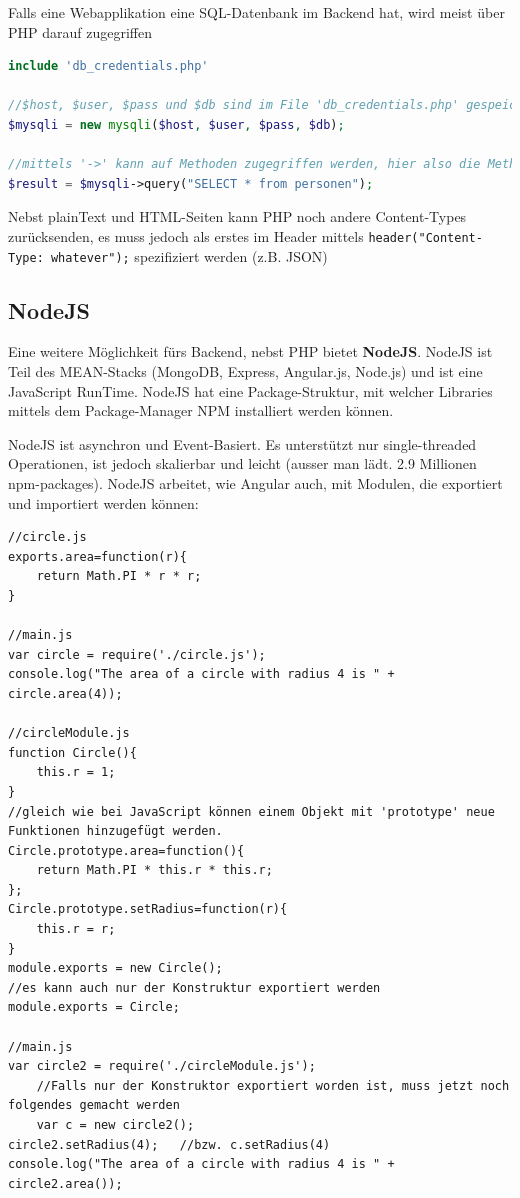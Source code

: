 \documentclass[a4paper, 11pt]{article}
\newcommand{\code}[1]{\texttt{#1}}
\begin{document}
\vspace{10px}

\noindent Falls eine Webapplikation eine SQL-Datenbank im Backend hat, wird meist über PHP darauf zugegriffen

\begin{lstlisting}[language=php]
include 'db_credentials.php'

//$host, $user, $pass und $db sind im File 'db_credentials.php' gespeichert
$mysqli = new mysqli($host, $user, $pass, $db);

//mittels '->' kann auf Methoden zugegriffen werden, hier also die Methode 'query' vom mysqli-Objekt
$result = $mysqli->query("SELECT * from personen");

\end{lstlisting}

Nebst plainText und HTML-Seiten kann PHP noch andere Content-Types zurücksenden, es muss jedoch als erstes im Header mittels \code{header("Content-Type: whatever");} spezifiziert werden (z.B. JSON)

\subsection{NodeJS}
Eine weitere Möglichkeit fürs Backend, nebst PHP bietet \textbf{NodeJS}. NodeJS ist Teil des MEAN-Stacks (MongoDB, Express, Angular.js, Node.js) und ist eine JavaScript RunTime. NodeJS hat eine Package-Struktur, mit welcher Libraries mittels dem Package-Manager NPM installiert werden können.
\vspace{10px}

\noindent NodeJS ist asynchron und Event-Basiert. Es unterstützt nur single-threaded Operationen, ist jedoch skalierbar und leicht (ausser man lädt. 2.9 Millionen npm-packages). NodeJS arbeitet, wie Angular auch, mit Modulen, die exportiert und importiert werden können:

\begin{lstlisting}
//circle.js
exports.area=function(r){
	return Math.PI * r * r;
}

//main.js
var circle = require('./circle.js');
console.log("The area of a circle with radius 4 is " + circle.area(4));

//circleModule.js
function Circle(){
	this.r = 1;
}
//gleich wie bei JavaScript können einem Objekt mit 'prototype' neue Funktionen hinzugefügt werden.
Circle.prototype.area=function(){
	return Math.PI * this.r * this.r;
};
Circle.prototype.setRadius=function(r){
	this.r = r;
}
module.exports = new Circle();
//es kann auch nur der Konstruktur exportiert werden
module.exports = Circle;

//main.js
var circle2 = require('./circleModule.js');
	//Falls nur der Konstruktor exportiert worden ist, muss jetzt noch folgendes gemacht werden
	var c = new circle2();
circle2.setRadius(4);	//bzw. c.setRadius(4)
console.log("The area of a circle with radius 4 is " + circle2.area());
\end{lstlisting}
\end{document}
